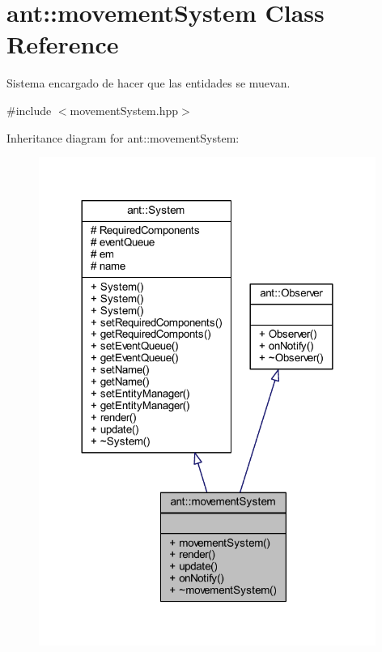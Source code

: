 \hypertarget{classant_1_1movement_system}{\section{ant\+:\+:movement\+System Class Reference}
\label{classant_1_1movement_system}
}


Sistema encargado de hacer que las entidades se muevan.  




{\ttfamily \#include $<$movement\+System.\+hpp$>$}



Inheritance diagram for ant\+:\+:movement\+System\+:
\nopagebreak
\begin{figure}[H]
\begin{center}
\leavevmode
\includegraphics[width=312pt]{d0/d1c/classant_1_1movement_system__inherit__graph}
\end{center}
\end{figure}


